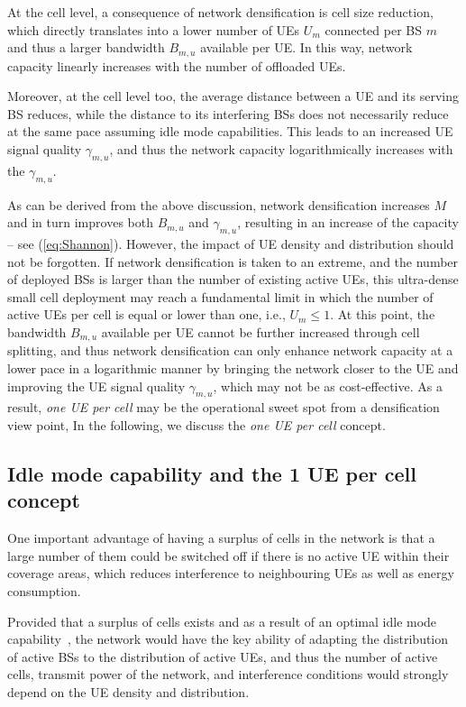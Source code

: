 \documentclass{IEEEtran}
\begin{document}
At the cell level,
a consequence of network densification is cell size reduction,
which directly translates into a lower number of \acp{UE} $U_m$ connected per \ac{BS} $m$ and thus a larger bandwidth $B_{m,u}$ available per \ac{UE}.
In this way, network capacity linearly increases with the number of offloaded \acp{UE}.

Moreover, at the cell level too,
the average distance between a \ac{UE} and its serving \ac{BS} reduces,
while the distance to its interfering \acp{BS} does not necessarily reduce at the same pace assuming idle mode capabilities.
This leads to an increased UE signal quality $\gamma_{m,u}$,
and thus the network capacity logarithmically increases with the $\gamma_{m,u}$.


As can be derived from the above discussion,
network densification increases $M$ and in turn improves both $B_{m,u}$ and $\gamma_{m,u}$,
resulting in an increase of the capacity
-- see (\ref{eq:Shannon}).
However, the impact of \ac{UE} density and distribution should not be forgotten.
If network densification is taken to an extreme,
and the number of deployed \acp{BS} is larger than the number of existing active \acp{UE},
this ultra-dense small cell deployment may reach a fundamental limit
in which the number of active \acp{UE} per cell is equal or lower than one, i.e., $U_m\leq1$.
At this point,
the bandwidth $B_{m,u}$ available per \ac{UE} cannot be further increased through cell splitting,
and thus network densification can only enhance network capacity  at a lower pace in a logarithmic manner
by bringing the network closer to the \ac{UE} and improving the \ac{UE} signal quality $\gamma_{m,u}$,
which may not be as cost-effective.
As a result,
\emph{one \ac{UE} per cell} may be the operational sweet spot from a densification view point,
In the following, we discuss the \emph{one \ac{UE} per cell} concept.

\subsection{Idle mode capability and the 1 UE per cell concept}

One important advantage of having a surplus of cells in the network is that a large number of them could be switched off if there is no active \ac{UE} within their coverage areas,
which reduces interference to neighbouring \acp{UE} as well as energy consumption.

Provided that a surplus of cells exists and as a result of an optimal idle mode capability~\cite{Ashraf:10a},
the network would have the key ability of adapting the distribution of active \acp{BS} to the distribution of active \acp{UE},
and thus the number of active cells, transmit power of the network, and interference conditions
would strongly depend on the \ac{UE} density and distribution.
\end{document}
